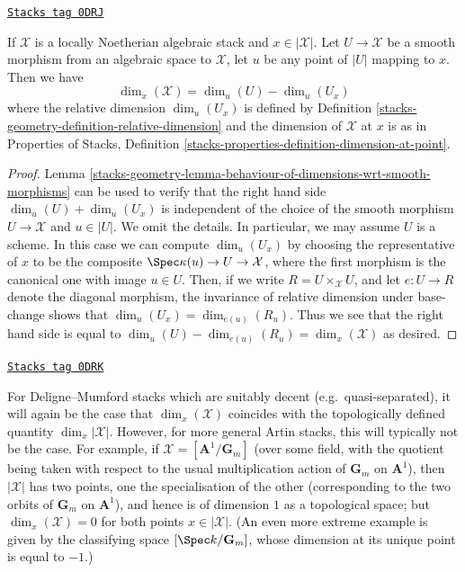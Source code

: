 \begin{lemma}
\label{stacks-geometry-lemma-dimension-for-stacks}
\href{https://stacks.math.columbia.edu/tag/0DRJ}{\texttt{Stacks tag 0DRJ}}

If $\mathcal{X}$ is a locally Noetherian algebraic stack and
$x \in |\mathcal{X}|$. Let $U \to \mathcal{X}$ be a smooth morphism
from an algebraic space to $\mathcal{X}$, let $u$ be any point of $|U|$
mapping to $x$. Then we have
$$
\dim_x(\mathcal{X}) =  \dim_u(U) - \dim_{u}(U_x)
$$
where the relative dimension $\dim_u(U_x)$ is defined
by Definition \ref{stacks-geometry-definition-relative-dimension} and the
dimension of $\mathcal{X}$ at $x$ is as in
Properties of Stacks, Definition
\ref{stacks-properties-definition-dimension-at-point}.
\end{lemma}

\begin{proof}
Lemma \ref{stacks-geometry-lemma-behaviour-of-dimensions-wrt-smooth-morphisms}
can be used to verify that the right hand side
$\dim_u(U) + \dim_u(U_x)$ is independent of the choice
of the smooth morphism $U \to \mathcal{X}$ and $u \in |U|$.
We omit the details. In particular, we may assume $U$ is a scheme.
In this case we can compute $\dim_u(U_x)$
by choosing the representative of $x$
to be the composite $\Spec \kappa(u) \to U \to \mathcal{X}$, where
the first morphism is the canonical one with image $u \in U$.
Then, if we write $R = U \times_{\mathcal{X}} U$, and let
$e : U \to R$ denote the diagonal morphism, the invariance of
relative dimension under base-change shows that
$\dim_u(U_x) = \dim_{e(u)}(R_u)$. Thus we see that
the right hand side is equal to
$\dim_u (U) - \dim_{e(u)}(R_u) = \dim_x(\mathcal{X})$ as desired.
\end{proof}

\begin{remark}[Dimension DM]
\label{stacks-geometry-remark-dimension-DM}
\href{https://stacks.math.columbia.edu/tag/0DRK}{\texttt{Stacks tag 0DRK}}

For Deligne--Mumford stacks which are suitably decent
(e.g.\ quasi-separated),
it will again be the case that $\dim_x(\mathcal{X})$ coincides with the
topologically
defined quantity $\dim_x |\mathcal{X}|$.  However, for more general Artin
stacks,
this will typically not be the case.  For example, if
$\mathcal{X} = [\mathbf{A}^1/\mathbf{G}_m]$
(over some field, with the quotient being taken with
respect to the usual multiplication action of $\mathbf{G}_m$ on $\mathbf{A}^1$),
then  $|\mathcal{X}|$ has two points, one the specialisation of the other
(corresponding
to the two orbits of $\mathbf{G}_m$ on $\mathbf{A}^1$), and hence is of
dimension $1$ as
a topological space; but $\dim_x (\mathcal{X}) = 0$ for both points
$x \in |\mathcal{X}|$.
(An even more extreme example is given by the classifying space
$[\Spec k/\mathbf{G}_m]$, whose dimension at its unique point
is equal to $-1$.)
\end{remark}

